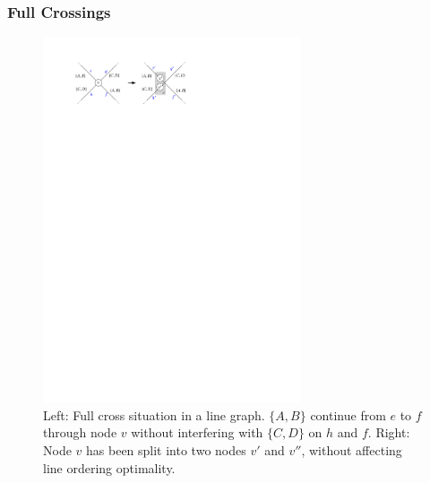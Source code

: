 \documentclass[format=acmsmall, review=false, screen=true]{acmart}
\begin{document}
\subsubsection{Full Crossings}

\begin{figure}
  \centering
  \includegraphics[width=0.68\textwidth]{untangling/fullcross.pdf}
  \caption{Left: Full cross situation in a line graph. $\{A, B\}$ continue from $e$ to $f$ through node $v$ without interfering with $\{C, D\}$ on $h$ and $f$. Right: Node $v$ has been split into two nodes $v'$ and $v''$, without affecting line ordering optimality.}  
  \label{FIG:untangle_fullcross}
\end{figure}
\end{document}

